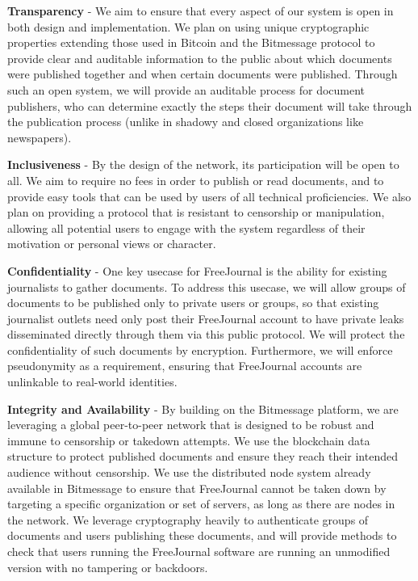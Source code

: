 \documentclass[letterpaper,10pt,oneside]{sphinxmanual}
\begin{document}
\textbf{Transparency} - We aim to ensure that every aspect of our system is open in both design and implementation.  We plan on using
unique cryptographic properties extending those used in Bitcoin and the Bitmessage protocol to provide clear and auditable
information to the public about which documents were published together and when certain documents were published.  Through such
an open system, we will provide an auditable process for document publishers, who can determine exactly the steps their document
will take through the publication process (unlike in shadowy and closed organizations like newspapers).

\textbf{Inclusiveness} - By the design of the network, its participation will be open to all.  We aim to require no fees in order to
publish or read documents, and to provide easy tools that can be used by users of all technical proficiencies.  We also plan on
providing a protocol that is resistant to censorship or manipulation, allowing all potential users to engage with the system
regardless of their motivation or personal views or character.

\textbf{Confidentiality} - One key usecase for FreeJournal is the ability for existing journalists to gather documents.  To address
this usecase, we will allow groups of documents to be published only to private users or groups, so that existing journalist
outlets need only post their FreeJournal account to have private leaks disseminated directly through them via this public
protocol.  We will protect the confidentiality of such documents by encryption.  Furthermore, we will enforce pseudonymity as a
requirement, ensuring that FreeJournal accounts are unlinkable to real-world identities.

\textbf{Integrity and Availability} - By building on the Bitmessage platform, we are leveraging a global peer-to-peer network that is
designed to be robust and immune to censorship or takedown attempts.  We use the blockchain data structure to protect published
documents and ensure they reach their intended audience without censorship.  We use the distributed node system already
available in Bitmessage to ensure that FreeJournal cannot be taken down by targeting a specific organization or set of servers,
as long as there are nodes in the network.  We leverage cryptography heavily to authenticate groups of documents and users
publishing these documents, and will provide methods to check that users running the FreeJournal software are running an
unmodified version with no tampering or backdoors.
\end{document}
